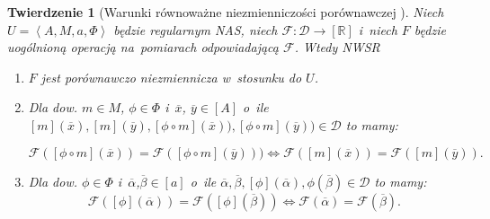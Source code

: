 \documentclass[12pt,a4paper]{report}
\newtheorem{tw}[definition]{Twierdzenie}
\newcommand{\domkniecie}[1]{\left[ {#1} \right] }
\newcommand{\tuple}[1]{\left\langle {#1} \right\rangle}
\begin{document}
\begin{tw}[Warunki równoważne niezmienniczości porównawczej {\citep[Tw. 1]{adams1965theory}}]
Niech $U=\tuple{A,M,a,\Phi}$ będzie regularnym NAS, niech $\mathcal{F}:\mathcal{D}\to \domkniecie{\mathbb{R}}$ i~niech $F$ będzie uogólnioną operacją na~pomiarach odpowiadającą $\mathcal{F}$. Wtedy
NWSR
\begin{enumerate}
\item
$F$ jest porównawczo niezmiennicza w~stosunku do $U$.
\item
Dla dow. $m \in M$, $\phi \in \Phi$ i~$\overline{x}$, $\overline{y} \in \domkniecie{A}$ o~ile $\domkniecie{m}(\overline{x}), \domkniecie{
m}(\overline{y}), \domkniecie{\phi\circ m}(\overline{x})), \domkniecie{\phi\circ m}(\overline{y})) \in \mathcal{D}$ to mamy:

$$
\mathcal{F}(\domkniecie{\phi \circ m}(\overline{x}))=\mathcal{F}(\domkniecie{\phi \circ m}(\overline{y}))) \iff \mathcal{F}(\domkniecie{m}(\overline{x}))=\mathcal{F}(\domkniecie{m}(\overline{y})).
$$
\item
Dla dow. $\phi \in \Phi$ i~$\overline{\alpha}$,$ \overline{\beta} \in \domkniecie{a}$ o~ile $\overline{\alpha}, \overline{\beta}, \domkniecie{\phi}(\overline{\alpha}), \phi(\overline{\beta}) \in \mathcal{D}$ to mamy:
\begin{equation*}
\mathcal{F}(\domkniecie{\phi}(\overline{\alpha}))=\mathcal{F}(\domkniecie{\phi}(\overline{\beta})) \iff \mathcal{F}(\overline{\alpha})=\mathcal{F}(\overline{\beta}).
\end{equation*}
\end{enumerate}

\end{tw}
\end{document}
